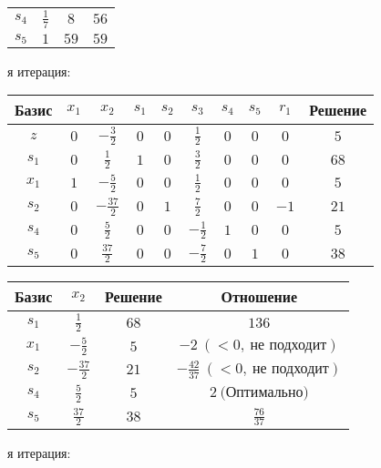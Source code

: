 \documentclass{article}%
\begin{document}
\begin{flushleft}
\begin{tabular}{|cccc|}
$s_{4}$&$\frac{1}{7}$&$8$&$56$\\%
$s_{5}$&$1$&$59$&$59$\\%
\hline%
\end{tabular}%
\newline%
\newline%
я итерация: %
\newline%
\newline%
\renewcommand{\arraystretch}{1.3}%
\begin{tabular}{|c|cccccccc|c|}%
\hline%
Базис&$x_{1}$&$x_{2}$&$s_{1}$&$s_{2}$&$s_{3}$&$s_{4}$&$s_{5}$&$r_{1}$&Решение\\%
\hline%
$z$&$0$&$-\frac{3}{2}$&$0$&$0$&$\frac{1}{2}$&$0$&$0$&$0$&$5$\\%
\hline%
$s_{1}$&$0$&$\frac{1}{2}$&$1$&$0$&$\frac{3}{2}$&$0$&$0$&$0$&$68$\\%
$x_{1}$&$1$&$-\frac{5}{2}$&$0$&$0$&$\frac{1}{2}$&$0$&$0$&$0$&$5$\\%
$s_{2}$&$0$&$-\frac{37}{2}$&$0$&$1$&$\frac{7}{2}$&$0$&$0$&$-1$&$21$\\%
$s_{4}$&$0$&$\frac{5}{2}$&$0$&$0$&$-\frac{1}{2}$&$1$&$0$&$0$&$5$\\%
$s_{5}$&$0$&$\frac{37}{2}$&$0$&$0$&$-\frac{7}{2}$&$0$&$1$&$0$&$38$\\%
\hline%
\end{tabular}%
\newline%
\newline%
\newline%
\begin{tabular}{|cccc|}%
\hline%
Базис&$x_{2}$&Решение&Отношение\\%
\hline%
$s_{1}$&$\frac{1}{2}$&$68$&$136$\\%
$x_{1}$&$-\frac{5}{2}$&$5$&$-2\: (< 0, \: \text{не подходит})$\\%
$s_{2}$&$-\frac{37}{2}$&$21$&$-\frac{42}{37}\: (< 0, \: \text{не подходит})$\\%
$s_{4}$&$\frac{5}{2}$&$5$&$2\: \text{(Оптимально)}$\\%
$s_{5}$&$\frac{37}{2}$&$38$&$\frac{76}{37}$\\%
\hline%
\end{tabular}%
\newline%
\newline%
я итерация: %
\newline%
\newline%
\renewcommand{\arraystretch}{1.3}%
\begin{tabular}{|c|cccccccc|c|}%

\end{tabular}
\end{flushleft}
\end{document}
